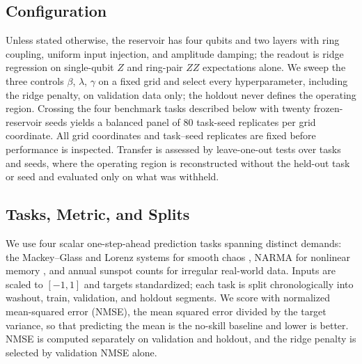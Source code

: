 \documentclass[10pt,conference]{IEEEtran}
\begin{document}
\subsection{Configuration}
Unless stated otherwise, the reservoir has four qubits and two layers with ring coupling, uniform input injection, and amplitude damping; the readout is ridge regression on single-qubit $Z$ and ring-pair $ZZ$ expectations alone. We sweep the three controls $\beta$, $\lambda$, $\gamma$ on a fixed grid and select every hyperparameter, including the ridge penalty, on validation data only; the holdout never defines the operating region. Crossing the four benchmark tasks described below with twenty frozen-reservoir seeds yields a balanced panel of $80$ task-seed replicates per grid coordinate. All grid coordinates and task–seed replicates are fixed before performance is inspected. Transfer is assessed by leave-one-out tests over tasks and seeds, where the operating region is reconstructed without the held-out task or seed and evaluated only on what was withheld.



\subsection{Tasks, Metric, and Splits}
We use four scalar one-step-ahead prediction tasks spanning distinct demands: the Mackey--Glass and Lorenz systems for smooth chaos \cite{mackey1977,lorenz1963}, NARMA for nonlinear memory \cite{narendra1990}, and annual sunspot counts for irregular real-world data. Inputs are scaled to $[-1,1]$ and targets standardized; each task is split chronologically into washout, train, validation, and holdout segments. We score with normalized mean-squared error (NMSE), the mean squared error divided by the target variance, so that predicting the mean is the no-skill baseline and lower is better. NMSE is computed separately on validation and holdout, and the ridge penalty is selected by validation NMSE alone.
\end{document}

